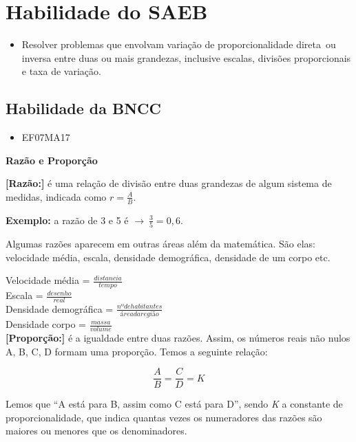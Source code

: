 \section{Habilidade do SAEB}
\begin{itemize}
\item Resolver problemas que envolvam variação de
proporcionalidade direta~ou inversa entre duas ou mais grandezas,
inclusive escalas, divisões proporcionais e taxa de variação.
\end{itemize}

\subsection{Habilidade da BNCC}
\begin{itemize}
\item EF07MA17
\end{itemize}


\textbf{Razão e Proporção}

\textbf{{[}Razão:{]}} é uma relação de divisão entre duas grandezas de
algum sistema de medidas, indicada como $r  = \frac{A}{B}$.

\textbf{Exemplo:} a razão de 3 e 5 é
$\rightarrow \ \frac{3}{5} = 0,6$.

Algumas razões aparecem em outras áreas além da matemática. São elas:
velocidade média, escala, densidade demográfica, densidade de um corpo
etc.

Velocidade média = $\frac{distancia}{tempo}$ \\

Escala = $\frac{desenho}{real}$ \\

Densidade demográfica = $\frac{nº de habitantes}{área da região}$ \\

Densidade  corpo = $\frac{massa}{volume}$ \\

\textbf{{[}Proporção:{]}} é a igualdade entre duas razões. Assim, os
números reais não nulos A, B, C, D formam uma proporção. Temos a
seguinte relação:

$$\frac{A}{B} = \frac{C}{D} = K$$

Lemos que ``A está para B, assim como C está para D'', sendo \emph{K} a
constante de proporcionalidade, que indica quantas vezes os numeradores
das razões são maiores ou menores que os denominadores.

